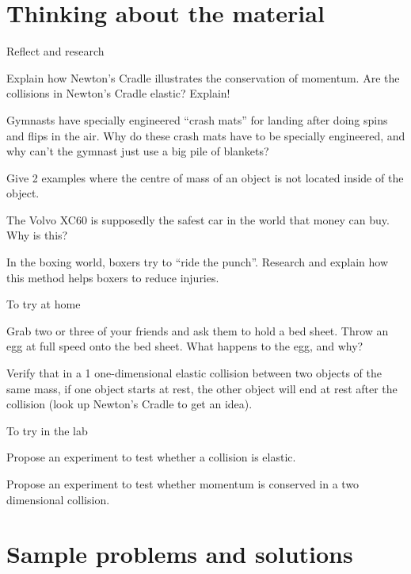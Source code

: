 \newpage
\section{Thinking about the material}

\begin{chapteractivity}{Reflect and research}
{
\item Explain how Newton's Cradle illustrates the conservation of momentum. Are the collisions in Newton's Cradle elastic? Explain! 
\item Gymnasts have specially engineered ``crash mats'' for landing after doing spins and flips in the air. Why do these crash mats have to be specially engineered, and why can't the gymnast just use a big pile of blankets?
\item Give 2 examples where the centre of mass of an object is not located inside of the object.
\item The Volvo XC60 is supposedly the safest car in the world that money can buy. Why is this?
\item In the boxing world, boxers try to ``ride the punch''. Research and explain how this method helps boxers to reduce injuries.
}
\end{chapteractivity}

\begin{chapteractivity}{To try at home}
{
\item Grab two or three of your friends and ask them to hold a bed sheet. Throw an egg at full speed onto the bed sheet. What happens to the egg, and why? 
\item Verify that in a 1 one-dimensional elastic collision between two objects of the same mass, if one object starts at rest, the other object will end at rest after the collision (look up Newton's Cradle to get an idea).
}
\end{chapteractivity}

\begin{chapteractivity}{To try in the lab}
{
\item Propose an experiment to test whether a collision is elastic.
\item Propose an experiment to test whether momentum is conserved in a two dimensional collision.
}
\end{chapteractivity}

\newpage
\section{Sample problems and solutions}
